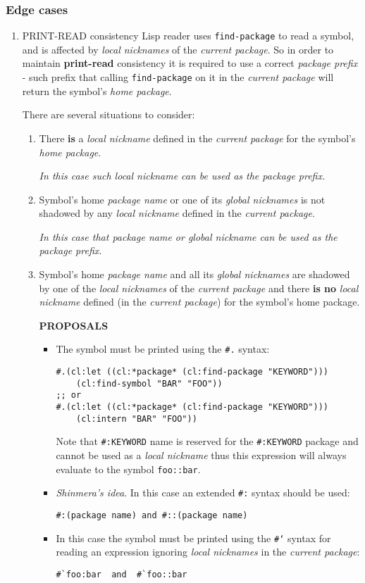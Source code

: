 \documentclass[11pt]{article}
\begin{document}
\subsubsection{Edge cases}
\label{sec:orgfcf1791}
\begin{enumerate}
\item PRINT-READ consistency
\label{sec:org175afae}
Lisp reader uses \texttt{find-package} to read a symbol, and is affected by \emph{local
nicknames} of the \emph{current package}. So in order to maintain \textbf{print-read}
consistency it is required to use a correct \emph{package prefix} - such prefix
that calling \texttt{find-package} on it in the \emph{current package} will return the
symbol's \emph{home package}.

There are several situations to consider:
\begin{enumerate}
\item There \textbf{is} a \emph{local nickname} defined in the \emph{current package} for the
symbol's \emph{home package}.

\emph{In this case such local nickname can be used as the package prefix.}
\item Symbol's home \emph{package name} or one of its \emph{global nicknames} is not
shadowed by any \emph{local nickname} defined in the \emph{current package}.

\emph{In this case that package name or global nickname can be used as the
package prefix.}
\item Symbol's home \emph{package name} and all its \emph{global nicknames} are shadowed
by one of the \emph{local nicknames} of the \emph{current package} and there \textbf{is
no} \emph{local nickname} defined (in the \emph{current package}) for the symbol's
home package.

\textbf{PROPOSALS}
\begin{itemize}
\item The symbol must be printed using the \texttt{\#.} syntax:
\begin{verbatim}
#.(cl:let ((cl:*package* (cl:find-package "KEYWORD")))
    (cl:find-symbol "BAR" "FOO"))
;; or
#.(cl:let ((cl:*package* (cl:find-package "KEYWORD")))
    (cl:intern "BAR" "FOO"))
\end{verbatim}
Note that \texttt{\#:KEYWORD} name is reserved for the \texttt{\#:KEYWORD} package and
cannot be used as a \emph{local nickname} thus this expression will always
evaluate to the symbol \texttt{foo::bar}.
\item \emph{Shinmera's idea}. In this case an extended \texttt{\#:} syntax should be used:
\begin{verbatim}
#:(package name) and #::(package name)
\end{verbatim}
\item In this case the symbol must be printed using the \texttt{\#`} syntax for
reading an expression ignoring \emph{local nicknames} in the \emph{current
package}:
\begin{verbatim}
#`foo:bar  and  #`foo::bar
\end{verbatim}



\end{itemize}
\end{enumerate}
\end{enumerate}
\end{document}
